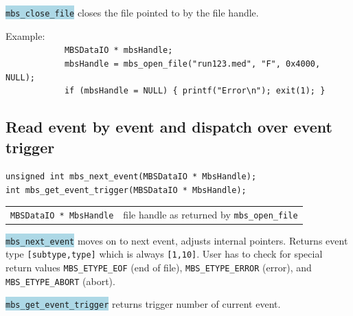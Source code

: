 \documentclass[10pt]{article}
\newcommand{\blue}[1]{\colorbox{lightblue}{\texttt{#1}}}
\newenvironment{yellowboxed}
	{\begin{Sbox}\begin{minipage}[t]}
	{\end{minipage}\end{Sbox}\colorbox{yellow}{\TheSbox}}
\newenvironment{blueboxed}
	{\begin{Sbox}\begin{minipage}[t]}
	{\end{minipage}\end{Sbox}\colorbox{lightblue}{\TheSbox}}
\begin{document}
\blue{mbs\_close\_file} closes the file pointed to by the file handle.
\vspace{5mm}

\begin{yellowboxed}{\linewidth}
Example:\\
\verb+            MBSDataIO * mbsHandle;+\\
\verb+            mbsHandle = mbs_open_file("run123.med", "F", 0x4000, NULL);+\\
\verb+            if (mbsHandle = NULL) { printf("Error\n"); exit(1); }+\\
\end{yellowboxed}\vspace{5mm}
\newpage
\subsection{Read event by event and dispatch over event trigger}\vspace{3mm}
\begin{center}
\begin{blueboxed}{.7\linewidth}
	\verb+unsigned int mbs_next_event(MBSDataIO * MbsHandle);+\\
	\verb+int mbs_get_event_trigger(MBSDataIO * MbsHandle);+
\end{blueboxed}
\end{center}
\begin{center}
\begin{tabular}{ll}
\verb+MBSDataIO * MbsHandle+	& file handle as returned by \verb+mbs_open_file+\\
\end{tabular}
\end{center}
\blue{mbs\_next\_event} moves on to next event, adjusts internal pointers.
Returns event type \verb+[subtype,type]+ which is always \verb+[1,10]+.
User has to check for special return values \verb+MBS_ETYPE_EOF+ (end of file),
\verb+MBS_ETYPE_ERROR+ (error), and \verb+MBS_ETYPE_ABORT+ (abort).

\blue{mbs\_get\_event\_trigger} returns trigger number of current event.
\vspace{5mm}
\end{document}
